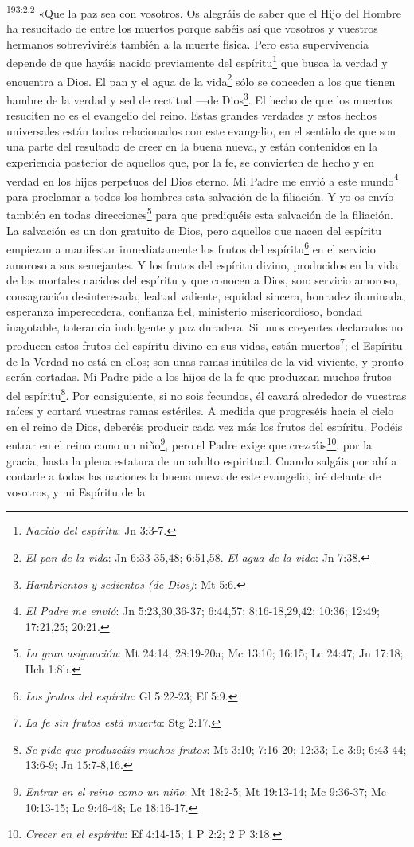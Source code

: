 \par 
\textsuperscript{193:2.2} «Que la paz sea con vosotros. Os alegráis de saber que el Hijo del Hombre ha resucitado de entre los muertos porque sabéis así que vosotros y vuestros hermanos sobreviviréis también a la muerte física. Pero esta supervivencia depende de que hayáis nacido previamente del espíritu\footnote{\textit{Nacido del espíritu}: Jn 3:3-7.} que busca la verdad y encuentra a Dios. El pan y el agua de la vida\footnote{\textit{El pan de la vida}: Jn 6:33-35,48; 6:51,58. \textit{El agua de la vida}: Jn 7:38.} sólo se conceden a los que tienen hambre de la verdad y sed de rectitud ---de Dios\footnote{\textit{Hambrientos y sedientos (de Dios)}: Mt 5:6.}. El hecho de que los muertos resuciten no es el evangelio del reino. Estas grandes verdades y estos hechos universales están todos relacionados con este evangelio, en el sentido de que son una parte del resultado de creer en la buena nueva, y están contenidos en la experiencia posterior de aquellos que, por la fe, se convierten de hecho y en verdad en los hijos perpetuos del Dios eterno. Mi Padre me envió a este mundo\footnote{\textit{El Padre me envió}: Jn 5:23,30,36-37; 6:44,57; 8:16-18,29,42; 10:36; 12:49; 17:21,25; 20:21.} para proclamar a todos los hombres esta salvación de la filiación. Y yo os envío también en todas direcciones\footnote{\textit{La gran asignación}: Mt 24:14; 28:19-20a; Mc 13:10; 16:15; Lc 24:47; Jn 17:18; Hch 1:8b.} para que prediquéis esta salvación de la filiación. La salvación es un don gratuito de Dios, pero aquellos que nacen del espíritu empiezan a manifestar inmediatamente los frutos del espíritu\footnote{\textit{Los frutos del espíritu}: Gl 5:22-23; Ef 5:9.} en el servicio amoroso a sus semejantes. Y los frutos del espíritu divino, producidos en la vida de los mortales nacidos del espíritu y que conocen a Dios, son: servicio amoroso, consagración desinteresada, lealtad valiente, equidad sincera, honradez iluminada, esperanza imperecedera, confianza fiel, ministerio misericordioso, bondad inagotable, tolerancia indulgente y paz duradera. Si unos creyentes declarados no producen estos frutos del espíritu divino en sus vidas, están muertos\footnote{\textit{La fe sin frutos está muerta}: Stg 2:17.}; el Espíritu de la Verdad no está en ellos; son unas ramas inútiles de la vid viviente, y pronto serán cortadas. Mi Padre pide a los hijos de la fe que produzcan muchos frutos del espíritu\footnote{\textit{Se pide que produzcáis muchos frutos}: Mt 3:10; 7:16-20; 12:33; Lc 3:9; 6:43-44; 13:6-9; Jn 15:7-8,16.}. Por consiguiente, si no sois fecundos, él cavará alrededor de vuestras raíces y cortará vuestras ramas estériles. A medida que progreséis hacia el cielo en el reino de Dios, deberéis producir cada vez más los frutos del espíritu. Podéis entrar en el reino como un niño\footnote{\textit{Entrar en el reino como un niño}: Mt 18:2-5; Mt 19:13-14; Mc 9:36-37; Mc 10:13-15; Lc 9:46-48; Lc 18:16-17.}, pero el Padre exige que crezcáis\footnote{\textit{Crecer en el espíritu}: Ef 4:14-15; 1 P 2:2; 2 P 3:18.}, por la gracia, hasta la plena estatura de un adulto espiritual. Cuando salgáis por ahí a contarle a todas las naciones la buena nueva de este evangelio, iré delante de vosotros, y mi Espíritu de la 